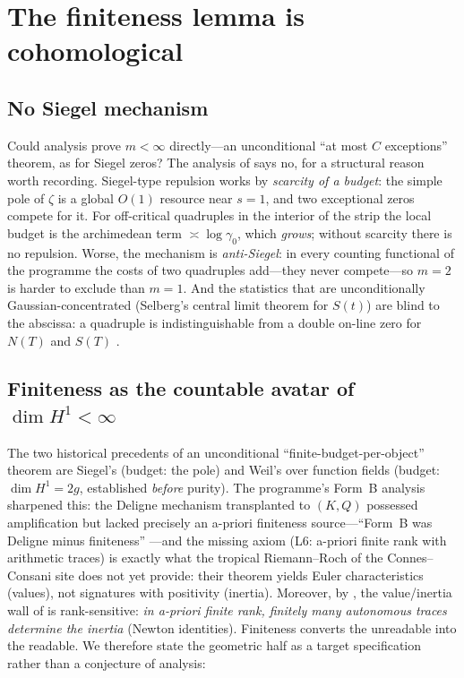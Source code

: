 \documentclass[11pt]{amsart}
\theoremstyle{definition}
\theoremstyle{remark}
\begin{document}
\section{The finiteness lemma is cohomological}\label{sec:finiteness}

\subsection{No Siegel mechanism}
Could analysis prove $m<\infty$ directly---an unconditional ``at most $C$
exceptions'' theorem, as for Siegel zeros? The analysis of
\cite[]{P40} says no, for a structural reason worth recording.
Siegel-type repulsion works by \emph{scarcity of a budget}: the simple pole
of $\zeta$ is a global $O(1)$ resource near $s=1$, and two exceptional
zeros compete for it. For off-critical quadruples in the interior of the
strip the local budget is the archimedean term $\asymp\log\gamma_0$, which
\emph{grows}; without scarcity there is no repulsion. Worse, the mechanism
is \emph{anti-Siegel}: in every counting functional of the programme the
costs of two quadruples add---they never compete---so $m=2$ is harder to
exclude than $m=1$. And the statistics that are unconditionally
Gaussian-concentrated (Selberg's central limit theorem for $S(t)$) are
blind to the abscissa: a quadruple is indistinguishable from a double
on-line zero for $N(T)$ and $S(T)$ \cite[Lem.~5.1]{P40}.

\subsection{Finiteness as the countable avatar of $\dim H^1<\infty$}
The two historical precedents of an unconditional
``finite-budget-per-object'' theorem are Siegel's (budget: the pole) and
Weil's over function fields (budget: $\dim H^1=2g$, established
\emph{before} purity). The programme's Form~B analysis sharpened this:
the Deligne mechanism transplanted to $(K,Q)$ possessed amplification but
lacked precisely an a-priori finiteness source---``Form~B was Deligne minus
finiteness'' \cite[]{P40}---and the missing axiom (L6: a-priori
finite rank with arithmetic traces) is exactly what the tropical
Riemann--Roch of the Connes--Consani site does not yet provide: their
theorem yields Euler characteristics (values), not signatures with
positivity (inertia). Moreover, by \cite[Prop.~4.5]{P40}, the
value/inertia wall of \cite{P43} is rank-sensitive: \emph{in a-priori
finite rank, finitely many autonomous traces determine the inertia}
(Newton identities). Finiteness converts the unreadable into the readable.
We therefore state the geometric half as a target specification rather than
a conjecture of analysis:
\end{document}

